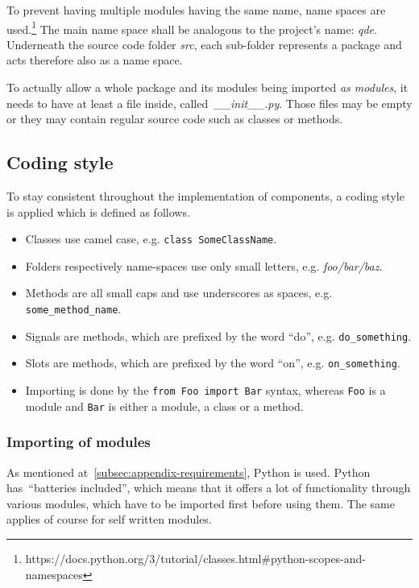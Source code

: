 \documentclass[
    a4paper,      %
    10pt,         %
    openright,    %
    notitlepage,  %
    parskip=half, %
]{scrreprt}       %
\theoremstyle{definition}                    %
\begin{document}
To prevent having multiple modules having the same name, name spaces are
used.\footnote{https://docs.python.org/3/tutorial/classes.html\#python-scopes-and-namespaces}
The main name space shall be analogous to the project's name: \textit{qde}. Underneath
the source code folder \textit{src}, each sub-folder represents a package and acts
therefore also as a name space.

To actually allow a whole package and its modules being imported \textit{as modules},
it needs to have at least a file inside, called~\textit{\_\_init\_\_.py}. Those files may be
empty or they may contain regular source code such as classes or methods.

\subsection{Coding style}
\label{subsec:appendix-implementation-coding-style}

To stay consistent throughout the implementation of components, a coding style
is applied which is defined as follows.

\begin{itemize}
\item Classes use camel case, e.g. \verb+class SomeClassName+.
\item Folders respectively name-spaces use only small letters, e.g.
  \textit{foo/bar/baz}.
\item Methods are all small caps and use underscores as spaces, e.g. \verb+some_method_name+.
\item Signals are methods, which are prefixed by the word \enquote{do}, e.g. \verb+do_something+.
\item Slots are methods, which are prefixed by the word \enquote{on}, e.g. \verb+on_something+.
\item Importing is done by the \verb+from Foo import Bar+ syntax, whereas
  \verb+Foo+ is a module and \verb+Bar+ is either a module, a class or a method.
\end{itemize}

\subsubsection{Importing of modules}
\label{ssubsec:appendix-implementation-coding-style-imports}

As mentioned at~\autoref{subsec:appendix-requirements}, Python is used. Python
has~\enquote{batteries included}, which means that it offers a lot of
functionality through various modules, which have to be imported first before
using them. The same applies of course for self written modules.
\end{document}
